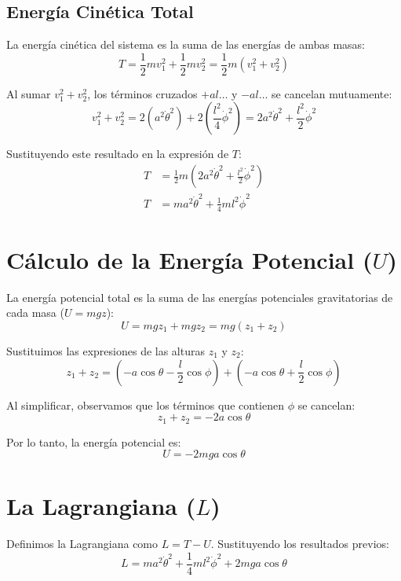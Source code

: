 \documentclass[12pt, a4paper]{article}
\begin{document}
\subsection*{Energía Cinética Total}
La energía cinética del sistema es la suma de las energías de ambas masas:
\begin{equation}
    T = \frac{1}{2} m v_1^2 + \frac{1}{2} m v_2^2 = \frac{1}{2} m (v_1^2 + v_2^2)
\end{equation}

Al sumar $v_1^2 + v_2^2$, los términos cruzados $+al\dots$ y $-al\dots$ se cancelan mutuamente:
\[
v_1^2 + v_2^2 = 2(a^2 \dot{\theta}^2) + 2\left(\frac{l^2}{4} \dot{\phi}^2\right) = 2a^2 \dot{\theta}^2 + \frac{l^2}{2} \dot{\phi}^2
\]

Sustituyendo este resultado en la expresión de $T$:
\begin{align}
    T &= \frac{1}{2} m \left( 2a^2 \dot{\theta}^2 + \frac{l^2}{2} \dot{\phi}^2 \right) \nonumber \\
    T &= m a^2 \dot{\theta}^2 + \frac{1}{4} m l^2 \dot{\phi}^2
\end{align}

\section*{Cálculo de la Energía Potencial ($U$)}

La energía potencial total es la suma de las energías potenciales gravitatorias de cada masa ($U = m g z$):
\begin{equation}
    U = m g z_1 + m g z_2 = m g (z_1 + z_2)
\end{equation}

Sustituimos las expresiones de las alturas $z_1$ y $z_2$:
\[
z_1 + z_2 = \left(-a \cos \theta - \frac{l}{2} \cos \phi\right) + \left(-a \cos \theta + \frac{l}{2} \cos \phi\right)
\]

Al simplificar, observamos que los términos que contienen $\phi$ se cancelan:
\[
z_1 + z_2 = -2a \cos \theta
\]

Por lo tanto, la energía potencial es:
\begin{equation}
    U = -2 m g a \cos \theta
\end{equation}

\section*{La Lagrangiana ($L$)}

Definimos la Lagrangiana como $L = T - U$. Sustituyendo los resultados previos:
\begin{equation}
    L = m a^2 \dot{\theta}^2 + \frac{1}{4} m l^2 \dot{\phi}^2 + 2 m g a \cos \theta
\end{equation}
\end{document}
